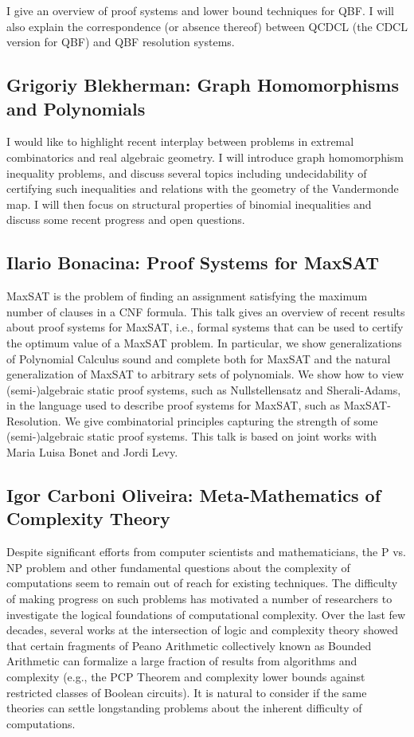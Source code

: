 \documentclass[11pt]{article}
\begin{document}
I give an overview of proof systems and lower bound techniques for QBF. I will also explain the correspondence (or absence thereof) between QCDCL (the CDCL version for QBF) and QBF resolution systems.

\subsection*{Grigoriy Blekherman: Graph Homomorphisms and Polynomials}\label{Blekherman}

I would like to highlight recent interplay between problems in extremal combinatorics and real algebraic geometry. I will introduce graph homomorphism inequality problems, and
discuss several topics including undecidability of certifying such inequalities and relations with the geometry of the Vandermonde map. I will then focus on structural properties of binomial inequalities and discuss some recent progress and open questions.

\subsection*{Ilario Bonacina: Proof Systems for MaxSAT}\label{Bonacina}

MaxSAT is the problem of finding an assignment satisfying the maximum number of clauses in a CNF formula. This talk gives an overview of recent results about proof systems for MaxSAT, i.e., formal systems that can be used to certify the optimum value of a MaxSAT problem. In particular, we show generalizations of Polynomial Calculus sound and complete both for MaxSAT and the natural generalization of MaxSAT to arbitrary sets of polynomials. We show how to view (semi-)algebraic static proof systems, such as Nullstellensatz and Sherali-Adams, in the language used to describe proof systems for MaxSAT, such as MaxSAT-Resolution. We give combinatorial principles capturing the strength of some (semi-)algebraic static proof systems. This talk is based on joint works with Maria Luisa Bonet and Jordi Levy.


\subsection*{Igor Carboni Oliveira: Meta-Mathematics of Complexity Theory}\label{Oliveira}

Despite significant efforts from computer scientists and mathematicians, the P vs. NP problem and other fundamental questions about the complexity of computations seem to remain out of reach for existing techniques. The difficulty of making progress on such problems has motivated a number of researchers to investigate the logical foundations of computational complexity. Over the last few decades, several works at the intersection of logic and complexity theory showed that certain fragments of Peano Arithmetic collectively known as Bounded Arithmetic can formalize a large fraction of results from algorithms and complexity (e.g., the PCP Theorem and complexity lower bounds against restricted classes of Boolean circuits). It is natural to consider if the same theories can settle longstanding problems about the inherent difficulty of computations. 
\end{document}
